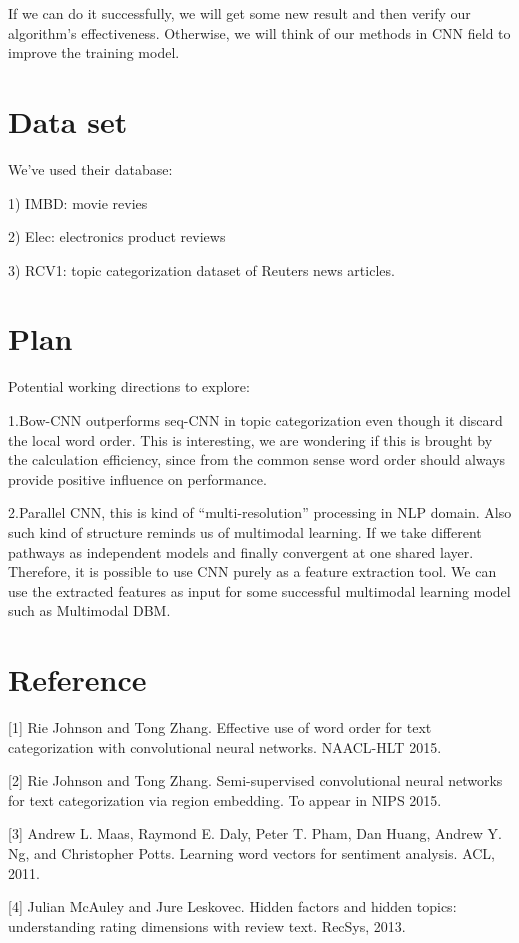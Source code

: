 \documentclass{article}
\begin{document}
If we can do it successfully, we will get some new result and then verify our algorithm's effectiveness. Otherwise, we will think of our methods in CNN field to improve the training model.


\section{Data set}

We've used their database:

1) IMBD: movie revies

2) Elec: electronics product reviews

3) RCV1: topic categorization dataset of Reuters news articles.


\section{Plan}

Potential working directions to explore:

1.Bow-CNN outperforms seq-CNN in topic categorization even though it discard the local word order. This is interesting, we are wondering if this is brought by the calculation efficiency, since from the common sense word order should always provide positive influence on performance.

2.Parallel CNN, this is kind of ``multi-resolution'' processing in NLP domain. Also such kind of structure reminds us of multimodal learning. If we take different pathways as independent models and finally convergent at one shared layer. Therefore, it is possible to use CNN purely as a feature extraction tool. We can use the extracted features as input for some successful multimodal learning model such as Multimodal DBM.


\section{Reference}
[1] Rie Johnson and Tong Zhang. Effective use of word order for text categorization with convolutional neural networks. NAACL-HLT 2015.
 
[2] Rie Johnson and Tong Zhang. Semi-supervised convolutional neural networks for text categorization via region embedding. To appear in NIPS 2015.

[3] Andrew L. Maas, Raymond E. Daly, Peter T. Pham, Dan Huang, Andrew Y. Ng, and Christopher Potts. Learning word vectors for sentiment analysis. ACL, 2011. 

[4] Julian McAuley and Jure Leskovec. Hidden factors and hidden topics: understanding rating dimensions with review text. RecSys, 2013.
\end{document}
